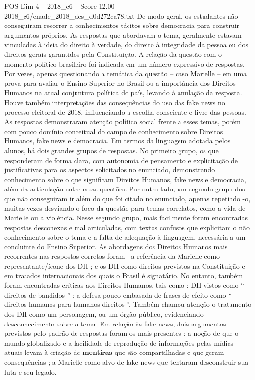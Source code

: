 \begin{textsample}{POS Dim 4 – 2018\_c6 – Score 12.00 – 2018\_c6/enade\_2018\_des\_d0d272ca78.txt}
De modo geral, os estudantes não conseguiram recorrer a conhecimentos tácitos sobre democracia para construir argumentos próprios.
As respostas que abordavam o tema, geralmente estavam vinculadas à ideia do direito à verdade, do direito à integridade da pessoa ou dos direitos gerais garantidos pela Constituição.
A relação da questão com o momento político brasileiro foi indicada em um número expressivo de respostas.
Por vezes, apenas questionando a temática da questão – caso Marielle – em uma prova para avaliar o Ensino Superior no Brasil ou a importância dos Direitos Humanos na atual conjuntura política do país, levando à anulação da resposta.
Houve também interpretações das consequências do uso das fake news no processo eleitoral de 2018, influenciando a escolha consciente e livre das pessoas.
As respostas demonstraram atenção político social frente a esses temas, porém com pouco domínio conceitual do campo de conhecimento sobre Direitos Humanos, fake news e democracia.
Em termos da linguagem adotada pelos alunos, há dois grandes grupos de respostas.
No primeiro grupo, os que responderam de forma clara, com autonomia de pensamento e explicitação de justificativas para os aspectos solicitados no enunciado, demonstrando conhecimento sobre o que significam Direitos Humanos, fake news e democracia, além da articulação entre essas questões.
Por outro lado, um segundo grupo dos que não conseguiram ir além do que foi citado no enunciado, apenas repetindo -o, muitas vezes desviando o foco da questão para temas correlatos, como a vida de Marielle ou a violência.
Nesse segundo grupo, mais facilmente foram encontradas respostas desconexas e mal articuladas, com textos confusos que explicitam o não conhecimento sobre o tema e a falta de adequação à linguagem, necessária a um concluinte do Ensino Superior.
As abordagens dos Direitos Humanos mais recorrentes nas respostas corretas foram : a referência da Marielle como representante/ícone dos DH ; e os DH como direitos previstos na Constituição e em tratados internacionais dos quais o Brasil é signatário.
No entanto, também foram encontradas críticas aos Direitos Humanos, tais como : DH vistos como “ direitos de bandidos ” ; a defesa pouco embasada de frases de efeito como “ direitos humanos para humanos direitos ”.
Também chamou atenção o tratamento dos DH como um personagem, ou um órgão público, evidenciando desconhecimento sobre o tema.
Em relação às fake news, dois argumentos previstos pelo padrão de respostas foram os mais presentes : a noção de que o mundo globalizado e a facilidade de reprodução de informações pelas mídias atuais levam à criação de \textbf{mentiras} que são compartilhadas e que geram consequências ; a Marielle como alvo de fake news que tentaram desconstruir sua luta e seu legado.

\end{textsample}
